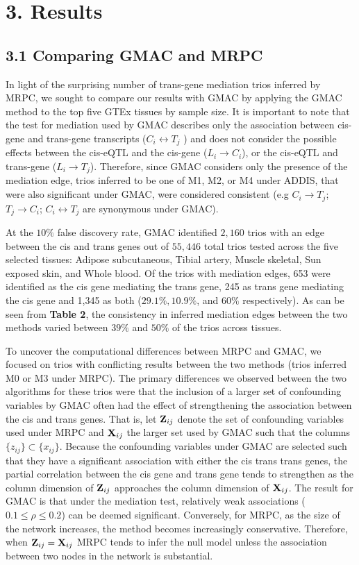 \documentclass[
]{article}
\begin{document}
\section*{3. Results}
\subsection*{3.1 Comparing GMAC and MRPC}

In light of the surprising number of trans-gene mediation trios inferred
by MRPC, we sought to compare our results with GMAC by applying the GMAC
method to the top five GTEx tissues by sample size. It is important to
note that the test for mediation used by GMAC describes only the
association between cis-gene and trans-gene transcripts
(\(C_i \leftrightarrow T_j\) ) and does not consider the possible
effects between the cis-eQTL and the cis-gene (\(L_i \rightarrow C_i\)),
or the cis-eQTL and trans-gene (\(L_i \rightarrow T_j\)). Therefore,
since GMAC considers only the presence of the mediation edge, trios
inferred to be one of M1, M2, or M4 under ADDIS, that were also
significant under GMAC, were considered consistent (e.g
\(C_i \rightarrow T_j\); \(T_j \rightarrow C_i\);
\(C_i \leftrightarrow T_j\) are synonymous under GMAC).

At the \(10\%\) false discovery rate, GMAC identified \(2,160\) trios
with an edge between the cis and trans genes out of \(55,446\) total
trios tested across the five selected tissues: Adipose subcutaneous,
Tibial artery, Muscle skeletal, Sun exposed skin, and Whole blood. Of
the trios with mediation edges, 653 were identified as the cis gene
mediating the trans gene, 245 as trans gene mediating the cis gene and
1,345 as both (\(29.1\%, 10.9\%\), and \(60\%\) respectively). As can be
seen from \textbf{Table 2}, the consistency in inferred mediation edges
between the two methods varied between \(39\%\) and \(50\%\) of the
trios across tissues.

To uncover the computational differences between MRPC and GMAC, we
focused on trios with conflicting results between the two methods (trios
inferred M0 or M3 under MRPC). The primary differences we observed
between the two algorithms for these trios were that the inclusion of a
larger set of confounding variables by GMAC often had the effect of
strengthening the association between the cis and trans genes. That is,
let \({\bf Z}_{ij}\) denote the set of confounding variables used under
MRPC and \({\bf X}_{ij}\) the larger set used by GMAC such that the
columns \(\{z_{ij} \} \subset \{x_{ij}\}\). Because the confounding
variables under GMAC are selected such that they have a significant
association with either the cis trans trans genes, the partial
correlation between the cis gene and trans gene tends to strengthen as
the column dimension of \({\bf Z}_{ij}\) approaches the column dimension
of \({\bf X}_{ij}\). The result for GMAC is that under the mediation
test, relatively weak associations (\(0.1 \leq \rho \leq 0.2\)) can be
deemed significant. Conversely, for MRPC, as the size of the network
increases, the method becomes increasingly conservative. Therefore, when
\({\bf Z}_{ij} = {\bf X}_{ij}\) MRPC tends to infer the null model
unless the association between two nodes in the network is substantial.
\end{document}
